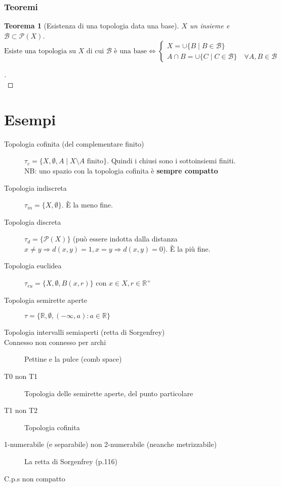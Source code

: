 \documentclass[a4paper,10pt]{article}
\newtheorem*{theorem}{Teorema}
\theoremstyle{remark}
\theoremstyle{definition}
\newenvironment{myproof}[1][\proofname]{%
  \begin{proof}[#1]$ $\\ \nobreak\ignorespaces
}{%
  \end{proof}
}
\begin{document}
\section*{Teoremi}
\begin{theorem}[Esistenza di una topologia data una base]
    $X$ un insieme e $\mathcal{B} \subset \mathcal{P}(X)$.
\begin{equation*}
    \mbox{Esiste una topologia su $X$ di cui $\mathcal{B}$ è una base} \Longleftrightarrow 
    \begin{cases}
    X = \cup \{B \mid B\in \mathcal{B}\} \\ 
  A \cap B = \cup \{C \mid C \in \mathcal{B}\} \quad   \forall A,B \in \mathcal{B}
\end{cases}
\end{equation*}
\end{theorem}

\begin{myproof}
    
\end{myproof}

\part*{Esempi}
\begin{description}
    \item[Topologia cofinita (del complementare finito)] $\tau_c = \{X, \emptyset, A \mid X \setminus A \mbox{ finito}\}$. Quindi i chiusi sono i sottoinsiemi finiti. \\
    NB: uno spazio con la topologia cofinita è \textbf{sempre compatto}
    \item[Topologia indiscreta] $\tau_{in} =\{X, \emptyset\}$. È la meno fine.
    \item[Topologia discreta] $\tau_{d} =\{\mathcal{P}(X)\}$ (può essere indotta dalla distanza $x \ne y \Rightarrow d(x,y)=1, x = y \Rightarrow d(x,y) = 0$). È la più fine.
    \item[Topologia euclidea] $\tau_{eu} =\{X, \emptyset, B(x,r)\}$ con $x \in X, r \in \mathbb{R}^+$
    \item[Topologia semirette aperte] $\tau =\{\mathbb{R}, \emptyset, (-\infty,a) : a \in \mathbb{R} \}$
   \item[Topologia intervalli semiaperti (retta di Sorgenfrey)] 
   \item[Connesso non connesso per archi] Pettine e la pulce (comb space)
   \item[T0 non T1] Topologia delle semirette aperte, del punto particolare
   \item[T1 non T2] Topologia cofinita 
   \item[1-numerabile (e separabile) non 2-numerabile (neanche metrizzabile)] La retta di Sorgenfrey (p.116)
   \item[C.p.s non compatto] 
\end{description}
\end{document}
